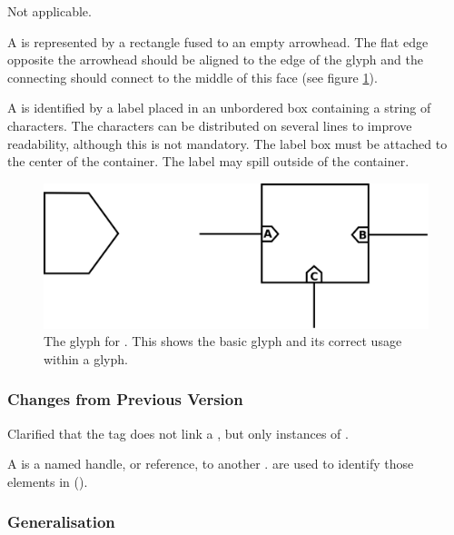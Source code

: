 \begin{glyphDescription}

\glyphSboTerm Not applicable.

\glyphContainer A  is represented by a rectangle fused to
an empty arrowhead.  The
flat edge opposite the arrowhead should be aligned to the edge of the
 glyph and the connecting should connect to the middle
of this face (see figure \ref{fig:techref:submapterminal}).

\glyphLabel A  is identified by a label placed in an
unbordered box containing a string of characters.  The characters can
be distributed on several lines to improve readability, although this
is not mandatory.  The label box must be attached to the center of the
container. The label may spill outside of the container.

\end{glyphDescription}

\begin{figure}[htb]
  \centering
  \includegraphics[scale = 0.3]{images/submapterminal}
  \caption{The \PD glyph for . This shows the
    basic glyph and its correct usage within a  glyph.}
  \label{fig:techref:submapterminal}
\end{figure}

\subsubsection{Changes from Previous Version}

Clarified that the tag does not link a , but
only instances of .

\label{defn:Tag}

A  is a named handle, or reference, to another .   are used to identify those elements in  ().

\subsubsection{Generalisation}

